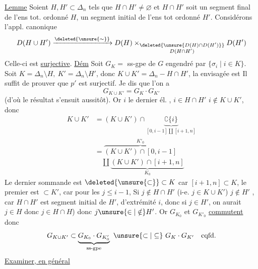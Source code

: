 \uline{Lemme} Soient $H,H'\subset\Delta_n$ tels que $H\cap H'\ne\varnothing$ et $H\cap H'$ soit un segment final de l'ens tot. ordonné $H$, un segment initial de l'ens tot ordonné $H'$. Considérons l'appl. canonique
\[
D(H\cup H')\xrightarrow{\deleted{\unsure{\sim}}}D(H)\mathbin{\times}_{\substack{\deleted{\unsure{D(H)\cap D(H')}}\\ D(H\cap H')}}D(H')
\]
Celle-ci est \uline{surjective}.
\uline{Dém} Soit  $G_K=$ ss-gpe de $G$ engendré par $\{\sigma_i\mid i\in K\}$. Soit  $K=\Delta_n\setminus H,\ K'=\Delta_n\setminus H'$, donc $K\cup K'=\Delta_n-H\cap H'$, la   envisagée est
Il suffit de prouver que $p'$ est surjectif. Je dis que l'on a
\[
G_{K\cup K'}=G_K\cdot G_{K'}
\]
(d'où  le résultat s'ensuit aussitôt).
Or   $i$ le dernier él. ,   $i\in H\cap H'$  $i\notin K\cup K'$, donc
\[
\begin{aligned}
K\cup K'&=(K\cup K')\cap\underbrace{\complement\{i\}}_{[0,i-1]\amalg[i+1,n]}\\
&=\overbrace{(K\cup K')\cap[0,i-1]}^{K'_0}\\
&\quad\amalg\underbrace{(K\cup K')\cap[i+1,n]}_{K_0}
\end{aligned}
\]
Le dernier sommande est $\deleted{\unsure{\subset}}\subset K$ car $[i+1,n]\subset K$, le premier est $\subset K'$, car pour les $j\leq i-1$,
 Si $j\notin H\cap H'$ (i-e. $j\in K\cup K'$)   $j\notin H'$ , car $H\cap H'$ est segment initial de $H'$, d'extrémité $i$, donc si $j\in H'$, on aurait $j\in H$ donc $j\in H\cap H$) donc $j\unsure{\in|\notin}H'$.
 
Or $G_{K_0}$ et $G_{K'_0}$ \uline{commutent} donc
\[
G_{K\cup K'}\subset\underbrace{G_{K_0}\cdot G_{K'_0}}_{\text{ss-gpe}}\ \unsure{\subset|\subseteq}\ G_K\cdot G_{K'}\quad\text{cqfd.}
\]
\uline{Examiner, en général}


